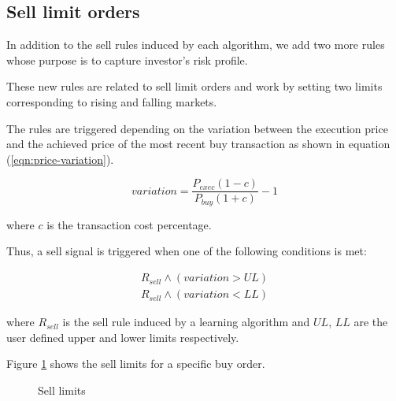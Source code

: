 \documentclass[preprint,3p,twocolumn]{elsarticle}
\begin{document}
\subsection{Sell limit orders}
\label{subsec:limit orders}
In addition to the sell rules induced by each algorithm, we add two more rules whose purpose is to capture investor's risk profile.

These new rules are related to sell limit orders and work by setting two limits corresponding to rising and falling markets.

The rules are triggered depending on the variation between the execution price and the achieved price of the most recent buy transaction as shown in equation (\ref{eqn:price-variation}).

\begin{equation} \label{eqn:price-variation}
variation = \dfrac{P_{exec}  (1 - c) }{P_{buy} (1 + c) } - 1
\end{equation}

where $c$ is the transaction cost percentage.

Thus, a sell signal is triggered when one of the following conditions is met:

\begin{align}
R_{sell} \wedge (variation > UL) \label{eqn:Sell-rule 1}\\
R_{sell} \wedge (variation < LL) \label{eqn:Sell-rule 2S}
\end{align}

where $R_{sell}$ is the sell rule induced by a learning algorithm and $UL$, $LL$ are the user defined upper and lower limits respectively.

Figure \ref{figure:Sell limits} shows the sell limits for a specific buy order.
\begin{figure}[h]
\centering
{}
\caption{\label{figure:Sell limits} Sell limits}
\end{figure}
\end{document}
